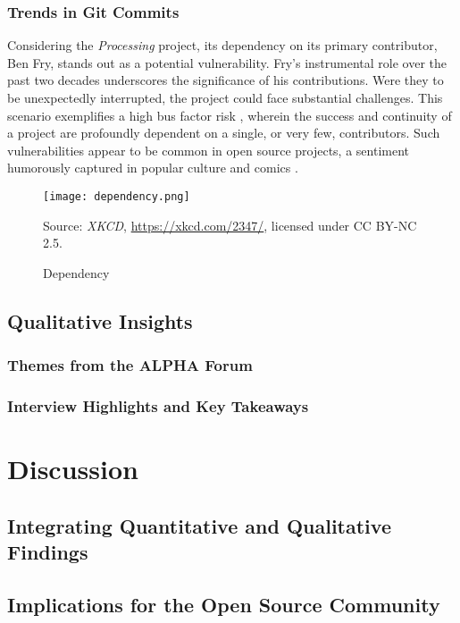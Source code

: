 \documentclass{article}
\begin{document}
\subsubsection{Trends in Git Commits}

Considering the \textit{Processing} project, its dependency on its primary contributor, Ben Fry, stands out as a potential vulnerability. Fry's instrumental role over the past two decades underscores the significance of his contributions. Were they to be unexpectedly interrupted, the project could face substantial challenges. This scenario exemplifies a high bus factor risk \parencite{BusFactor2023}, wherein the success and continuity of a project are profoundly dependent on a single, or very few, contributors. Such vulnerabilities appear to be common in open source projects, a sentiment humorously captured in popular culture and comics \parencite{munroeDependency2020}.

\begin{figure}[h!] 
    \centering
    \texttt{[image: dependency.png]} 
    \caption{Dependency}
    \label{fig:dependency_comic}
    \small Source: \textit{XKCD}, \url{https://xkcd.com/2347/}, licensed under CC BY-NC 2.5.
\end{figure}


\subsection{Qualitative Insights}
\subsubsection{Themes from the ALPHA Forum}
\subsubsection{Interview Highlights and Key Takeaways}

\section{Discussion}

\subsection{Integrating Quantitative and Qualitative Findings}
\subsection{Implications for the Open Source Community}
\end{document}
